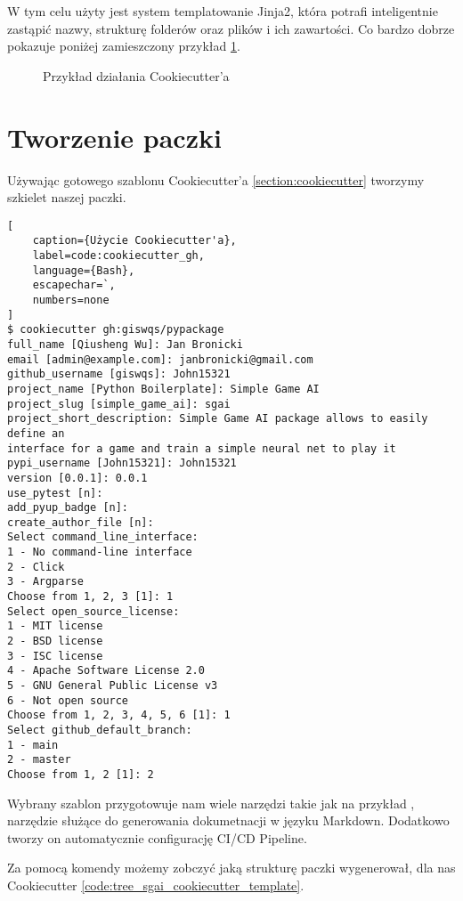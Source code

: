 W tym celu użyty jest system templatowanie Jinja2, która potrafi inteligentnie zastąpić nazwy, strukturę folderów oraz plików i ich zawartości. Co bardzo dobrze pokazuje poniżej zamieszczony przykład \ref{img:cookiecutter_example}.

\begin{figure}[h]
    \centering
    \caption{Przykład działania Cookiecutter'a \cite{CookiecutterExample}}
    \label{img:cookiecutter_example}
\end{figure}


\clearpage
\section{Tworzenie paczki}

Używając gotowego szablonu Cookiecutter'a \ref{section:cookiecutter}
\cite{geodemo} tworzymy szkielet naszej paczki.

\begin{onepage}
    \begin{lstlisting}[
    caption={Użycie Cookiecutter'a},
    label=code:cookiecutter_gh,
    language={Bash},
    escapechar=`,
    numbers=none
]
$ cookiecutter gh:giswqs/pypackage
full_name [Qiusheng Wu]: Jan Bronicki
email [admin@example.com]: janbronicki@gmail.com
github_username [giswqs]: John15321
project_name [Python Boilerplate]: Simple Game AI
project_slug [simple_game_ai]: sgai
project_short_description: Simple Game AI package allows to easily define an
interface for a game and train a simple neural net to play it
pypi_username [John15321]: John15321
version [0.0.1]: 0.0.1
use_pytest [n]:
add_pyup_badge [n]:
create_author_file [n]:
Select command_line_interface:
1 - No command-line interface
2 - Click
3 - Argparse
Choose from 1, 2, 3 [1]: 1
Select open_source_license:
1 - MIT license
2 - BSD license
3 - ISC license
4 - Apache Software License 2.0
5 - GNU General Public License v3
6 - Not open source
Choose from 1, 2, 3, 4, 5, 6 [1]: 1
Select github_default_branch:
1 - main
2 - master
Choose from 1, 2 [1]: 2
\end{lstlisting}
\end{onepage}

Wybrany szablon przygotowuje nam wiele narzędzi takie jak na przykład , narzędzie służące do generowania dokumetnacji w języku Markdown.
Dodatkowo tworzy on automatycznie configurację CI/CD Pipeline.

\clearpage

Za pomocą komendy  możemy zobczyć jaką strukturę paczki wygenerował, dla nas Cookiecutter \ref{code:tree_sgai_cookiecutter_template}.

